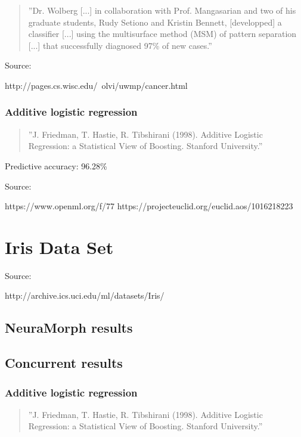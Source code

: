 \documentclass[8pt, a4paper]{article}
\begin{document}
\begin{quote}
''Dr. Wolberg [...] in collaboration with Prof. Mangasarian and two of his graduate students, Rudy Setiono and Kristin Bennett, [developped] a classifier [...] using the multisurface method (MSM) of pattern separation [...] that successfully diagnosed 97\% of new cases.''
\end{quote}

Source:

http://pages.cs.wisc.edu/~olvi/uwmp/cancer.html

\subsubsection{Additive logistic regression}

\begin{quote}
''J. Friedman, T. Hastie, R. Tibshirani (1998). Additive Logistic Regression: a Statistical View of Boosting. Stanford University.''
\end{quote}

Predictive accuracy: 96.28\%

Source:

https://www.openml.org/f/77
https://projecteuclid.org/euclid.aos/1016218223



\newpage
\section{Iris Data Set}

Source: 

http://archive.ics.uci.edu/ml/datasets/Iris/

\subsection{NeuraMorph results}



\subsection{Concurrent results}

\subsubsection{Additive logistic regression}

\begin{quote}
''J. Friedman, T. Hastie, R. Tibshirani (1998). Additive Logistic Regression: a Statistical View of Boosting. Stanford University.''
\end{quote}
\end{document}
